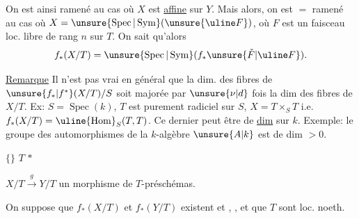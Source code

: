 On est ainsi ramené au cas où $X$ est \uline{affine} sur $Y$. Mais alors, on est $=$ ramené au cas où $X=\unsure{\operatorname{Spec}|\operatorname{Sym}}(\unsure{\uline F})$, où $F$ est un faisceau loc. libre de rang $n$ sur $T$. On sait qu'alors
\[
f_*(X/T)=\unsure{\operatorname{Spec}|\operatorname{Sym}}(f_*\unsure{\check F|\uline F}).
\]


\uline{Remarque} Il n'est pas vrai en général que la dim. des fibres de $\unsure{f_*|f^*}(X/T)/S$ soit majorée par $\unsure{\nu|d}$ fois la dim des fibres de  $X/T$. Ex:
$S=\operatorname{Spec}(k)$, $T$ est purement radiciel sur $S$, $X=T\times_S T$ i.e. $f_*(X/T)=\uline{\operatorname{Hom}}_S(T,T)$. Ce dernier peut être de \uline{dim}   sur $k$. Exemple: le groupe des automorphismes de la $k$-algèbre $\unsure{A|k}$ est de dim $>0$.

 $\{$$\}$ $T$   $*$

$X/T\xrightarrow{g}Y/T$ un morphisme   de $T$-préschémas.

On suppose que $f_*(X/T)$ et $f_*(Y/T)$ existent et  , , et que  $T$ sont loc. noeth.

